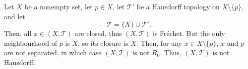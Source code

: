 \begin{example}
	\label{eg: T_1 but not T_2}
	Let $X$ be a nonempty set, let $p \in X$, let $\mathcal T'$ be a Hausdorff topology on $X \setminus \{p\}$, and let
	$$
	\mathcal T = \{X\} \cup \mathcal T'.
	$$
	Then, all $x \in (X, \mathcal T)$ are closed, thus $(X, \mathcal T)$ is Fr\'echet. But the only neighbourhood of $p$ is $X$, so its closure is $X$. Then, for any $x \in X \setminus \{p\}$, $x$ and $p$ are not separated, in which case $(X, \mathcal T)$ is not $R_0$. Thus, $(X, \mathcal T)$ is not Hausdorff.
\end{example}
















